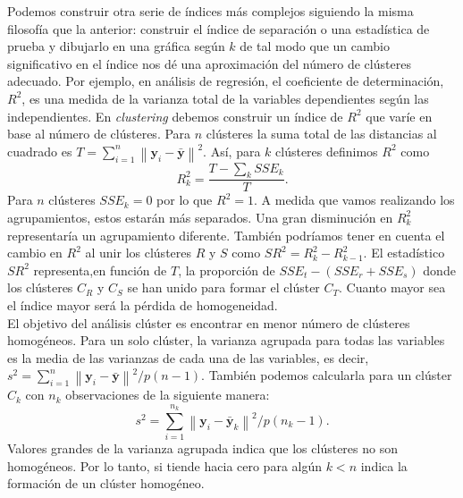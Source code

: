 \documentclass[a4paper, 20pt]{article}
\newcommand{\norm}[1]{\left\lVert#1\right\rVert}
\newcommand{\yy}{\textbf{y}}
\begin{document}
{Podemos construir otra serie de índices más complejos siguiendo la misma filosofía que la anterior: construir el índice de separación o una estadística de prueba y dibujarlo en una gráfica según $ k $ de tal modo que un cambio significativo en el índice nos dé una aproximación del número de clústeres adecuado. Por ejemplo, en análisis de regresión, el coeficiente de determinación, $ R^2 $, es una medida de la varianza total de la variables dependientes según las independientes. En \textit{clustering} debemos construir un índice de $ R^2 $ que varíe en base al número de clústeres. Para $ n $ clústeres la suma total de las distancias al cuadrado es $ T = \sum_{i = 1}^{n} \norm{\yy_i - \bar{\yy}}^2 $. Así, para $ k $ clústeres definimos $ R^2 $ como
\[
R^{2}_{k} = \frac{T - \sum_k SSE_k}{T}.
\]
Para $ n $ clústeres $ SSE_k = 0 $ por lo que $ R^2 = 1 $. A medida que vamos realizando los agrupamientos, estos estarán más separados. Una gran disminución en $ R^2_k $ representaría un agrupamiento diferente. También podríamos tener en cuenta el cambio en $ R^2 $ al unir los clústeres $ R $ y $ S $ como $ SR^2 = R_k^2 - R^2_{k-1} $. El estadístico $ SR^2 $ representa,en función de $ T $, la proporción de $ SSE_t - (SSE_r + SSE_s) $ donde los clústeres $ C_R $ y $ C_S $ se han unido para formar el clúster $ C_T $.  Cuanto mayor sea el índice mayor será la pérdida de homogeneidad.\\

El objetivo del análisis clúster es encontrar en menor número de clústeres homogéneos. Para un solo clúster, la varianza agrupada para todas las variables es la media de las varianzas de cada una de las variables, es decir, $ s^2 = \sum_{i=1}^{n} \norm{\yy_i - \bar{\yy}}^2/ p(n-1)$. También podemos calcularla para un clúster $ C_k $ con $ n_k $ observaciones de la siguiente manera:
\[
s^2 = \sum_{i=1}^{n_k} \norm{\yy_i - \bar{\yy}_k}^2/ p(n_k-1).
\]
Valores grandes de la varianza agrupada indica que los clústeres no son homogéneos. Por lo tanto, si tiende hacia cero para algún $  k < n $ indica la formación de un clúster homogéneo. \\

}
\end{document}
